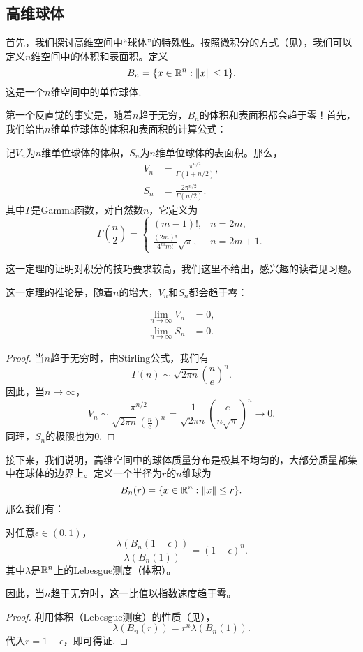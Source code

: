 \subsection{高维球体}
首先，我们探讨高维空间中“球体”的特殊性。按照微积分的方式（见），我们可以定义$n$维空间中的体积和表面积。定义
\[B_n = \{x \in \mathbb{R}^n: \left\|x\right\| \leq 1\}.\]
这是一个$n$维空间中的单位球体. 

第一个反直觉的事实是，随着$n$趋于无穷，$B_n$的体积和表面积都会趋于零！首先，我们给出$n$维单位球体的体积和表面积的计算公式：

\begin{theorem}
记$V_n$为$n$维单位球体的体积，$S_n$为$n$维单位球体的表面积。那么，
\begin{align*}
    V_n&=\frac{\pi^{n/2}}{\Gamma(1+n/2)},\\
    S_n&=\frac{2\pi^{n/2}}{\Gamma(n/2)}.
\end{align*}
其中$\Gamma$是Gamma函数，对自然数$n$，它定义为
\[\Gamma\left(\frac{n}{2}\right)=\begin{cases}
    (m-1)!, & n=2m,\\
    \frac{(2m)!}{4^mm!}\sqrt{\pi}, & n=2m+1.
\end{cases}
\]
\end{theorem}
这一定理的证明对积分的技巧要求较高，我们这里不给出，感兴趣的读者见习题。

这一定理的推论是，随着$n$的增大，$V_n$和$S_n$都会趋于零：

\begin{corollary}
\begin{align*}
    \lim_{n\to\infty} V_n&=0,\\
    \lim_{n\to\infty} S_n&=0.
\end{align*}
\end{corollary}
\begin{proof}
    当$n$趋于无穷时，由Stirling公式，我们有
        \[\Gamma(n)\sim\sqrt{2\pi n}\left(\frac{n}{e}\right)^n.\]
    因此，当$n\to\infty$，
    \[V_n\sim\frac{\pi^{n/2}}{\sqrt{2\pi n}\left(\frac{n}{e}\right)^n}=\frac{1}{\sqrt{2\pi n}}\left(\frac{e}{n\sqrt{\pi}}\right)^n\to 0.\]
    同理，$S_n$的极限也为$0$.
\end{proof}

接下来，我们说明，高维空间中的球体质量分布是极其不均匀的，大部分质量都集中在球体的边界上。定义一个半径为$r$的$n$维球为
\[B_n(r) = \{x \in \mathbb{R}^n: \left\|x\right\| \leq r\}.\]
那么我们有：
\begin{proposition}
对任意$\epsilon\in(0,1)$，
\[\frac{\lambda(B_n(1-\epsilon))}{\lambda(B_n(1))}=(1-\epsilon)^n.\]
其中$\lambda$是$\mathbb{R}^n$上的Lebesgue测度（体积）。

因此，当$n$趋于无穷时，这一比值以指数速度趋于零。
\end{proposition}
\begin{proof}
    利用体积（Lebesgue测度）的性质（见），
    \[\lambda(B_n(r))=r^n\lambda(B_n(1)).\]
    代入$r=1-\epsilon$，即可得证.
\end{proof}

